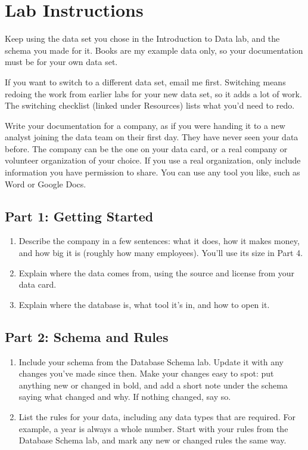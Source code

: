 \documentclass[12pt]{article}
\begin{document}
\section*{Lab Instructions}
Keep using the data set you chose in the Introduction to Data lab, and the schema you made for it. Books are my example data only, so your documentation must be for your own data set.

If you want to switch to a different data set, email me first. Switching means redoing the work from earlier labs for your new data set, so it adds a lot of work. The switching checklist (linked under Resources) lists what you'd need to redo.

Write your documentation for a company, as if you were handing it to a new analyst joining the data team on their first day. They have never seen your data before. The company can be the one on your data card, or a real company or volunteer organization of your choice. If you use a real organization, only include information you have permission to share. You can use any tool you like, such as Word or Google Docs.

\subsection*{Part 1: Getting Started}
\begin{enumerate}
    \item Describe the company in a few sentences: what it does, how it makes money, and how big it is (roughly how many employees). You'll use its size in Part 4.
    \item Explain where the data comes from, using the source and license from your data card.
    \item Explain where the database is, what tool it's in, and how to open it.
\end{enumerate}

\subsection*{Part 2: Schema and Rules}
\begin{enumerate}
    \item Include your schema from the Database Schema lab. Update it with any changes you've made since then. Make your changes easy to spot: put anything new or changed in bold, and add a short note under the schema saying what changed and why. If nothing changed, say so.
    \item List the rules for your data, including any data types that are required. For example, a year is always a whole number. Start with your rules from the Database Schema lab, and mark any new or changed rules the same way.
\end{enumerate}
\end{document}
